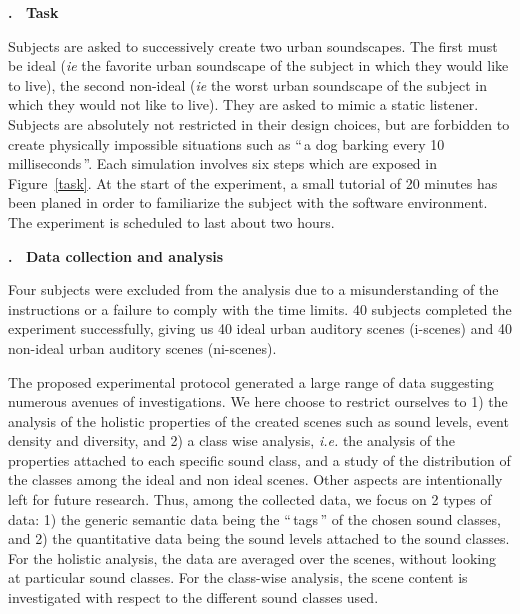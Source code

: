 \documentclass[12pt, titlepage, reqno]{article} %
\renewcommand{\subsection}[1]{\medskip \addtocounter{subsection}{1}\raggedright
    \textbf{\Alph{subsection}. \ #1} \medskip \setcounter{subsubsection}{0}\setlength{\parindent}{5ex}
}
\begin{document}
\subsection{Task}

Subjects are asked to successively create two urban soundscapes. The first must be ideal (\textit{ie} the favorite urban soundscape of the subject in which they would like to live), the second non-ideal (\textit{ie} the worst urban soundscape of the subject in which they would not like to live). They are asked to mimic a static listener. Subjects are absolutely not restricted in their design choices, but are forbidden to create physically impossible situations such as ``\,a dog barking every 10 milliseconds\,''. Each simulation involves six steps which are exposed in Figure~\ref{task}. At the start of the experiment, a small tutorial of 20 minutes has been planed in order to familiarize the subject with the software environment. The experiment is scheduled to last about two hours.


\subsection{Data collection and analysis}
\label{Data collection}
Four subjects were excluded from the analysis due to a  misunderstanding of the instructions or a failure to comply with the time limits. 40 subjects completed the experiment successfully, giving us 40 ideal urban auditory scenes (i-scenes) and 40 non-ideal urban auditory scenes (ni-scenes). 

The proposed experimental protocol generated a large range of data suggesting numerous avenues of investigations. We here choose to restrict ourselves to 1) the  analysis of the holistic properties of the created scenes such as sound levels, event density and diversity, and 2) a class wise analysis, \textit{i.e.} the analysis of the properties attached to each specific sound class, and a study of the distribution of the classes among the ideal and non ideal scenes. Other aspects are intentionally left for future research. Thus, among the collected data, we focus on 2 types of data: 1) the generic semantic data being the ``\,tags\,'' of the chosen sound classes, and 2) the quantitative data being the sound levels attached to the sound classes. For the holistic analysis, the data are averaged over the scenes, without looking at particular sound classes. For the class-wise analysis, the scene content is investigated with respect to the different sound classes used.
\end{document}

